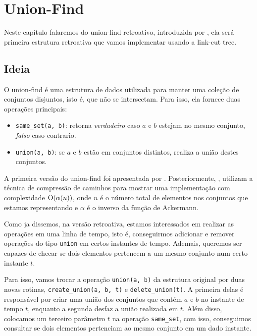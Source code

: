 
\chapter{Union-Find}
\label{cap:union-find}

Neste capítulo falaremos do union-find retroativo, introduzida por \citet{10.1145/1240233.1240236}, ela será primeira estrutura retroativa que vamos implementar usando a link-cut tree.

\section{Ideia}
\label{sec:uf-ideia}

O union-find é uma estrutura de dados utilizada para manter uma coleção de conjuntos disjuntos, isto é, que não se intersectam. Para isso, ela fornece duas operações principais:

\begin{itemize}
    \item \texttt{same\_set(a, b)}: retorna \emph{verdadeiro} caso $a$ e $b$ estejam no mesmo conjunto, \emph{falso} caso contrario.
    \item \texttt{union(a, b)}: se $a$ e $b$ estão em conjuntos distintos, realiza a união destes conjuntos.
\end{itemize}

A primeira versão do union-find foi apresentada por \citet{10.1145/364099.364331}. Posteriormente, \citet{10.1145/62.2160}, utilizam a técnica de compressão de caminhos para mostrar uma implementação com complexidade $\mathrm{O}( \alpha (n) )$, onde $n$ é o número total de elementos nos conjuntos que estamos representando e $\alpha$ é o inverso da função de Ackermann.

Como ja dissemos, na versão retroativa, estamos interessados em realizar as operações em uma linha de tempo, isto é, conseguirmos adicionar e remover operações do tipo \texttt{union} em certos instantes de tempo. Ademais, queremos ser capazes de checar se dois elementos pertencem a um mesmo conjunto num certo instante $t$.

Para isso, vamos trocar a operação \texttt{union(a, b)} da estrutura original por duas novas rotinas, \texttt{create\_union(a, b, t)} e \texttt{delete\_union(t)}. A primeira delas é responsável por criar uma união dos conjuntos que contém $a$ e $b$ no instante de tempo $t$, enquanto a segunda desfaz a união realizada em $t$. Além disso, colocamos um terceiro parâmetro $t$ na operação \texttt{same\_set}, com isso, conseguimos consultar se dois elementos pertenciam ao mesmo conjunto em um dado instante.

